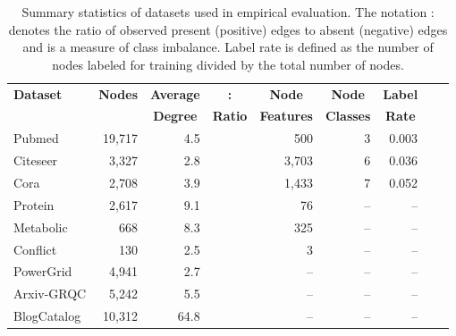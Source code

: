 \documentclass[letterpaper, conference]{IEEEtran}
\begin{document}
\begin{table}[ht]
\begin{center}
\caption[Caption for Table 1]{Summary statistics of datasets used in empirical evaluation. The notation : denotes the ratio of observed present (positive) edges to absent (negative) edges and is a measure of class imbalance. Label rate is defined as the number of nodes labeled for training divided by the total number of nodes.}
\begin{adjustbox}{width=0.5\textwidth}
	\begin{tabular} {l  r  r  r  r  r  r  r  r}
	\hline
	\multicolumn{1}{l}{\multirow{2}{*}{\textbf{Dataset}}} &
	\multicolumn{1}{c}{\multirow{2}{*}{\textbf{Nodes}}} &
    \multicolumn{1}{c}{\multirow{1}{*}{\textbf{Average}}} &
	\multicolumn{1}{c}{\multirow{1}{*}{\textbf{:}}} &
	\multicolumn{1}{c}{\multirow{1}{*}{\textbf{Node}}} &
	\multicolumn{1}{c}{\multirow{1}{*}{\textbf{Node}}} &
	\multicolumn{1}{c}{\multirow{1}{*}{\textbf{Label}}} \\
    & {}
    & \multicolumn{1}{c}{\multirow{1}{*}{\textbf{Degree}}}
    & \multicolumn{1}{c}{\multirow{1}{*}{\textbf{Ratio}}}
    & \multicolumn{1}{c}{\multirow{1}{*}{\textbf{Features}}}
    & \multicolumn{1}{c}{\multirow{1}{*}{\textbf{Classes}}}
    & \multicolumn{1}{c}{\multirow{1}{*}{\textbf{Rate}}} \\
    \hline \hline
    Pubmed
				& 19,717
				& 4.5
                & 
				& 500
				& 3
				& 0.003 \\
    Citeseer
				& 3,327 
				& 2.8
                & 
				& 3,703
				& 6
				& 0.036 \\
	Cora	
				& 2,708
				& 3.9
                & 
				& 1,433
				& 7
				& 0.052 \\
	Protein
					& 2,617
					& 9.1
                    & 
					& 76
					& --
					& -- \\
	Metabolic
					& 668
					& 8.3
                    & 
					& 325
					& --
					& -- \\
	Conflict
					& 130
					& 2.5
                    & 
					& 3
					& --
					& -- \\
	PowerGrid
				 & 4,941
				 & 2.7
                 & 
				 & --
				 & --
				 & -- \\
    Arxiv-GRQC
    		    & 5,242
                & 5.5
                & 
                & --
                & --
                & -- \\
	BlogCatalog
    		    & 10,312
                & 64.8
                & 
                & --
                & --
                & -- \\
	\hline
	\end{tabular}
	\label{tab1}
\end{adjustbox}
\end{center}
\end{table}
\end{document}
